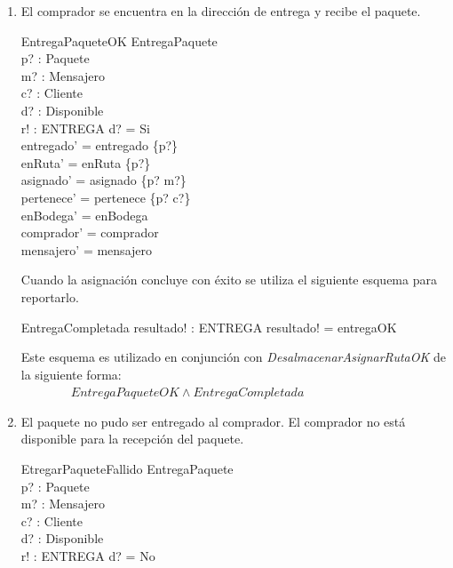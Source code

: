 \documentclass[12pt,a4paper,table]{article}
\begin{document}
\begin{enumerate}
\item El comprador se encuentra en la dirección de entrega y recibe el paquete.

\begin{schema}{EntregaPaqueteOK}
\Delta EntregaPaquete\\
p? : Paquete\\
m? : Mensajero\\
c? : Cliente\\
d? : Disponible\\
r! : ENTREGA
\where
d? = Si\\
entregado' = entregado \cup \{p?\}\\
enRuta' = enRuta \setminus \{p?\}\\
asignado' = asignado \setminus \{p? \mapsto m?\}\\
pertenece' = pertenece \setminus \{p? \mapsto c?\}\\
enBodega' = enBodega\\
comprador' = comprador\\
mensajero' = mensajero
\end{schema}
 
Cuando la asignación concluye con éxito se utiliza el siguiente esquema para reportarlo.

\begin{schema}{EntregaCompletada}
resultado! : ENTREGA
\where
resultado! = entregaOK
\end{schema}

Este esquema es utilizado en conjunción con \textit{DesalmacenarAsignarRutaOK} de la siguiente forma:\\

~~~~~~~~$EntregaPaqueteOK \wedge EntregaCompletada$\\

\item El paquete no pudo ser entregado al comprador. El comprador no está disponible para la recepción del paquete.

\begin{schema}{EtregarPaqueteFallido}
\Xi EntregaPaquete\\
p? : Paquete\\
m? : Mensajero\\
c? : Cliente\\
d? : Disponible\\
r! : ENTREGA
\where
d? = No
\end{schema}

\end{enumerate}
\end{document}
